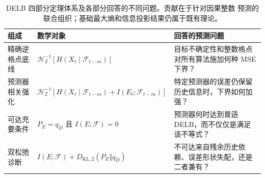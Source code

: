 \begin{table}[!htbp]
\caption{DELB 四部分定理体系及各部分回答的不同问题。贡献在于针对因果整数
预测的联合组织；基础最大熵和信息投影结果仍属于既有理论。}
\label{tab:delb_theorem_package}
\centering
\footnotesize
\setlength{\tabcolsep}{4pt}
\begin{tabularx}{\textwidth}{
    >{\RaggedRight\arraybackslash}p{}
    >{\RaggedRight\arraybackslash}p{}
    >{\RaggedRight\arraybackslash}X}
\toprule
\textbf{组成} & \textbf{数学对象} & \textbf{回答的预测问题}\\
\midrule
精确逆格点底线
&
\(\mathcal H_{\mathbb Z}^{-1}
 [H(X_t\mid\mathcal F_{t-m})]\)
&
目标不确定性和整数格点对所有算法施加何种 MSE 下界？\\

预测器相关强化
&
\(\mathcal H_{\mathbb Z}^{-1}
 [H(X_t\mid\mathcal F_{t-m})+I(E_t;\mathcal F_{t-m})]\)
&
特定预测器的误差仍保留历史信息时，下界如何加强？\\

可达充要条件
&
\(P_E=q_D\) 且 \(I(E;\mathcal F)=0\)
&
预测器何时达到普适 DELB，而不仅仅是满足该不等式？\\

双松弛诊断
&
\(I(E;\mathcal F)+D_{\mathrm{KL},2}(P_E\Vert q_D)\)
&
不可达来自残余历史依赖、误差形状失配，还是二者兼有？\\
\bottomrule
\end{tabularx}
\end{table}
